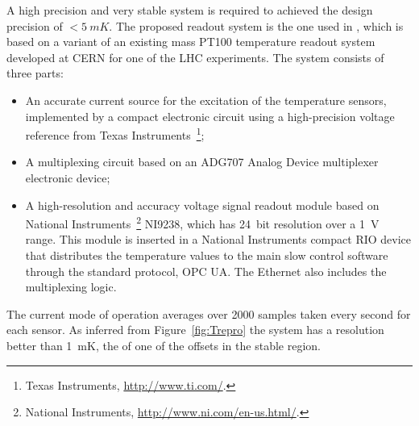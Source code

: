 A high precision and very stable system is required to achieved the design precision of $<\SI{5}{mK}$.
The proposed readout system is the one used in , which is based on a variant of an existing mass PT100 temperature readout system developed at
CERN for one of the LHC experiments. The system consists of three parts:
\begin{itemize}
\item An accurate current source for the excitation of the temperature sensors, implemented by a compact electronic circuit using a high-precision voltage reference from Texas Instruments~\footnote{Texas Instruments\texttrademark{}, \url{http://www.ti.com/}.};
\item A multiplexing circuit based on an ADG707 Analog Device multiplexer electronic device;
\item A high-resolution and accuracy voltage signal readout module based on National Instruments~\footnote{National Instruments\texttrademark{}, \url{http://www.ni.com/en-us.html/}.} NI9238, which has \SI{24}{bit} resolution over a \SI{1}{V} range.
  This module is inserted in a National Instruments compact RIO device that distributes the temperature values to the main slow control software
  through the standard protocol, OPC UA. The Ethernet  also includes the multiplexing logic.
\end{itemize}


The current mode of operation averages over \num{2000} samples taken every second for each sensor. 
As inferred from Figure~\ref{fig:Trepro} the system has a resolution better than
\SI{1}{mK}, the \rms of one of the offsets in the stable region.

